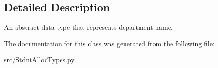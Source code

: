 \subsection{Detailed Description}
An abstract data type that represents department name. 

The documentation for this class was generated from the following file\+:\begin{DoxyCompactItemize}
\item 
src/\mbox{\hyperlink{_stdnt_alloc_types_8py}{Stdnt\+Alloc\+Types.\+py}}\end{DoxyCompactItemize}
